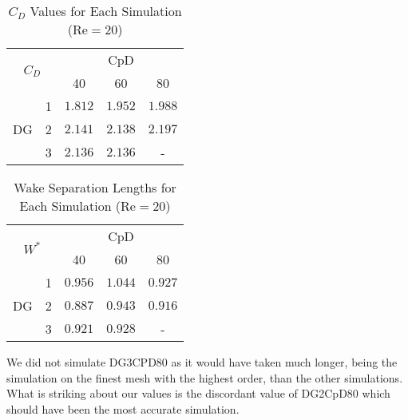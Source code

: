 \begin{table}[htp]
	\centering
	\def\arraystretch{1.5}
			\begin{tabular}{|c|c|c|c|c|}
				\hline
				\multicolumn{2}{|c|}{\multirow{2}{*}{$C_D$}} & \multicolumn{3}{c|}{CpD} \\ \cline{3-5} 
				\multicolumn{2}{|c|}{}                       & 40     & 60    & 80    \\ \hline
				\multirow{3}{*}{DG}            & 1           &    $1.812$    &  $1.952$     &    $1.988$    \\ \cline{2-5} 
				& 2           &    $2.141$    &    $2.138$   &   $2.197$     \\ \cline{2-5} 
				& 3           &    $2.136$    &     $2.136$  &   -     \\ \hline
			\end{tabular}
			\caption[$C_D$ Values for each simulation]{$C_D$ Values for Each Simulation ($\text{Re} = 20$)}	
			\label{C_D20}
		\end{table}
			\begin{table}[htp]
		\centering
		\def\arraystretch{1.5}
		\begin{tabular}{|c|c|c|c|c|}
			\hline
			\multicolumn{2}{|c|}{\multirow{2}{*}{$W^*$}} & \multicolumn{3}{c|}{CpD} \\ \cline{3-5} 
			\multicolumn{2}{|c|}{}                       & 40     & 60    & 80    \\ \hline
			\multirow{3}{*}{DG}            & 1           &    $0.956$    &     $1.044$  &    $0.927$    \\ \cline{2-5} 
			& 2           &    $0.887$    &     $0.943$  &    $0.916$    \\ \cline{2-5} 
			& 3           &     $0.921$   &     $0.928$  &    -    \\ \hline
		\end{tabular}
		\caption{Wake Separation Lengths for Each Simulation ($\text{Re} = 20$)}	
		\label{W20}
\end{table}
We did not simulate DG3CPD80 as it would have taken much longer, being the simulation on the finest mesh with the highest order, than the other simulations. What is striking about our values is the discordant value of DG2CpD80 which should have been the most accurate simulation. 
